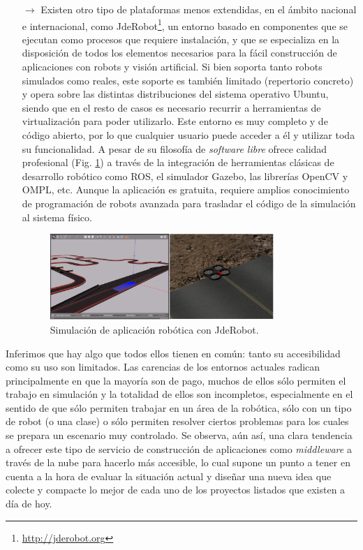\begin{itemize}
\item [$\rightarrow$] Existen otro tipo de plataformas menos extendidas, en el ámbito nacional e internacional, como JdeRobot\footnote{\url{http://jderobot.org}}, un entorno basado en componentes que se ejecutan como procesos que requiere instalación, y que se especializa en la disposición de todos los elementos necesarios para la fácil construcción de aplicaciones con robots y visión artificial. Si bien soporta tanto robots simulados como reales, este soporte es también limitado (repertorio concreto) y opera sobre las distintas distribuciones del sistema operativo Ubuntu, siendo que en el resto de casos es necesario recurrir a herramientas de virtualización para poder utilizarlo. Este entorno es muy completo y de código abierto, por lo que cualquier usuario puede acceder a él y utilizar toda su funcionalidad. A pesar de su filosofía de \textit{software libre} ofrece calidad profesional (Fig. \ref{jderobot}) a través de la integración de herramientas clásicas de desarrollo robótico como ROS, el simulador Gazebo, las librerías OpenCV y OMPL, etc. Aunque la aplicación es gratuita, requiere amplios conocimiento de programación de robots avanzada para trasladar el código de la simulación al sistema físico.

\begin{figure}[!hbtp]  \centering\noindent
    \includegraphics[width=0.8\textwidth]{figures/jderobot_simulation.png}
    \caption{Simulación de aplicación robótica con JdeRobot.}
    \label{jderobot}
\end{figure}

\end{itemize}

Inferimos que hay algo que todos ellos tienen en común: tanto su accesibilidad como su uso son limitados. Las carencias de los entornos actuales radican principalmente en que la mayoría son de pago, muchos de ellos sólo permiten el trabajo en simulación y la totalidad de ellos son incompletos, especialmente en el sentido de que sólo permiten trabajar en un área de la robótica, sólo con un tipo de robot (o una clase) o sólo permiten resolver ciertos problemas para los cuales se prepara un escenario muy controlado. Se observa, aún así, una clara tendencia a ofrecer este tipo de servicio de construcción de aplicaciones como \textit{middleware} a través de la nube para hacerlo más accesible, lo cual supone un punto a tener en cuenta a la hora de evaluar la situación actual y diseñar una nueva idea que colecte y compacte lo mejor de cada uno de los proyectos listados que existen a día de hoy.

